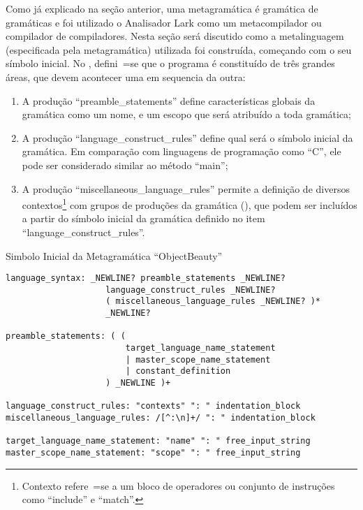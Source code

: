 Como já explicado na seção anterior,
uma metagramática é gramática de gramáticas e
foi utilizado o Analisador Lark \cite{larkContextualLexer} como um metacompilador ou
compilador de compiladores.
Nesta seção será discutido como a metalinguagem (especificada pela metagramática) utilizada foi construída,
começando com o seu símbolo inicial.
No ,
defini~=se que o programa é constituído de três grandes áreas,
que devem acontecer uma em sequencia da outra:
\begin{enumerate}
\item A produção ``preamble\_statements'' define características globais da gramática como um nome,
e um escopo que será atribuído a toda gramática;
\item A produção ``language\_construct\_rules'' define qual será o símbolo inicial da gramática.
Em comparação com linguagens de programação como ``C'',
ele pode ser considerado similar ao método ``main'';
\item A produção ``miscellaneous\_language\_rules'' permite a definição de diversos contextos\footnote{
Contexto refere~=se a um bloco de operadores ou
conjunto de instruções como ``include'' e
``match''.
} com grupos de produções da gramática (),
que podem ser incluídos a partir do símbolo inicial da gramática definido no item ``language\_construct\_rules''.
\end{enumerate}%
\begin{code}
\caption{Simbolo Inicial da Metagramática ``ObjectBeauty''}
\label{simboloInicialDaMetagramatica}
\begin{verbatim}
language_syntax: _NEWLINE? preamble_statements _NEWLINE?
                    language_construct_rules _NEWLINE?
                    ( miscellaneous_language_rules _NEWLINE? )*
                    _NEWLINE?

preamble_statements: ( (
                        target_language_name_statement
                        | master_scope_name_statement
                        | constant_definition
                    ) _NEWLINE )+

language_construct_rules: "contexts" ": " indentation_block
miscellaneous_language_rules: /[^:\n]+/ ": " indentation_block

target_language_name_statement: "name" ": " free_input_string
master_scope_name_statement: "scope" ": " free_input_string
\end{verbatim}
\end{code}

